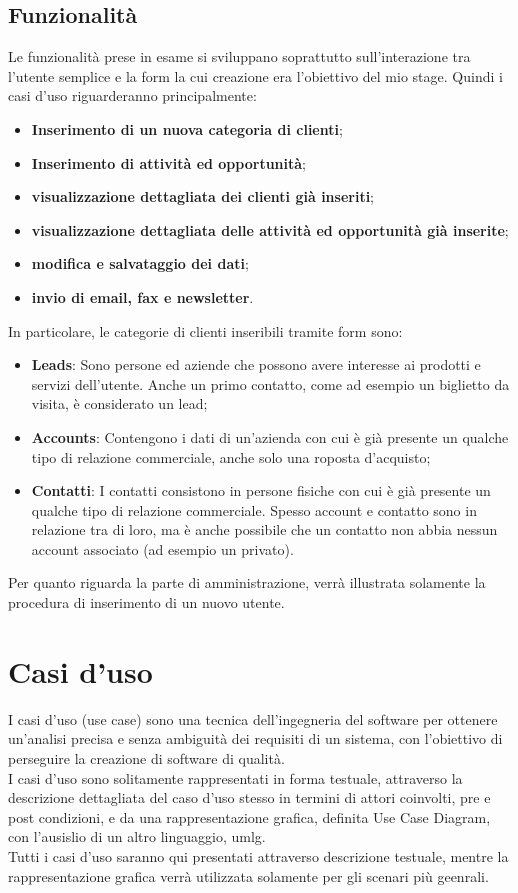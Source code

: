 \subsection{Funzionalità}
Le funzionalità prese in esame si sviluppano soprattutto sull'interazione tra l'utente semplice e la form la cui creazione era l'obiettivo del mio stage.
Quindi i casi d'uso riguarderanno principalmente:
\begin{itemize}
	\item \textbf{Inserimento di un nuova categoria di clienti};
	\item \textbf{Inserimento di attività ed opportunità};
	\item \textbf{visualizzazione dettagliata dei clienti già inseriti};
	\item \textbf{visualizzazione dettagliata delle attività ed opportunità già inserite};
	\item \textbf{modifica e salvataggio dei dati};
	\item \textbf{invio di email, fax e newsletter}.
\end{itemize}
In particolare, le categorie di clienti inseribili tramite form sono:
\begin{itemize}
	\item \textbf{Leads}: Sono persone ed aziende che possono avere interesse ai prodotti e servizi dell'utente. Anche un primo contatto, come ad esempio un biglietto da visita, è considerato un lead;
	\item \textbf{Accounts}: Contengono i dati di un'azienda con cui è già presente un qualche tipo di relazione commerciale, anche solo una roposta d'acquisto;
	\item \textbf{Contatti}: I contatti consistono in persone fisiche con cui è già presente un qualche tipo di relazione commerciale. Spesso account e contatto sono in relazione tra di loro, ma è anche possibile che un contatto non abbia nessun account associato (ad esempio un privato).
\end{itemize}
Per quanto riguarda la parte di amministrazione, verrà illustrata solamente la procedura di inserimento di un nuovo utente.

\section{Casi d'uso}
I casi d'uso (use case) sono una tecnica dell'ingegneria del software per ottenere un'analisi precisa e senza ambiguità dei requisiti di un sistema, con l'obiettivo di perseguire la creazione di software di qualità.\\
I casi d'uso sono solitamente rappresentati in forma testuale, attraverso la descrizione dettagliata del caso d'uso stesso in termini di attori coinvolti, pre e post condizioni, e da una rappresentazione grafica, definita Use Case Diagram, con l'ausislio di un altro linguaggio, \gls{umlg}.\\
Tutti i casi d'uso saranno qui presentati attraverso descrizione testuale, mentre la rappresentazione grafica verrà utilizzata solamente per gli scenari più geenrali.
